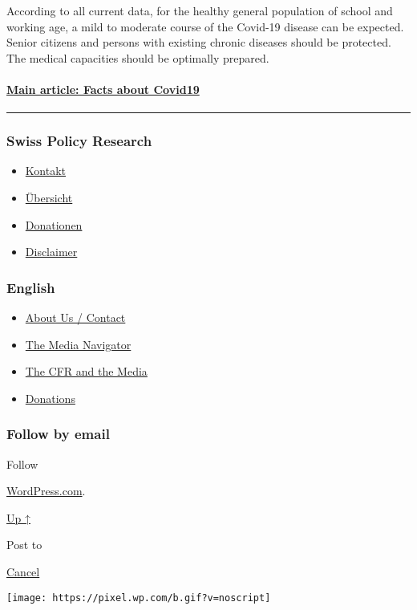 According to all current data, for the healthy general population of
school and working age, a mild to moderate course of the Covid-19
disease can be expected. Senior citizens and persons with existing
chronic diseases should be protected. The medical capacities should be
optimally prepared.

\hypertarget{main-article-facts-about-covid19}{%
\paragraph{\texorpdfstring{\href{https://swprs.org/a-swiss-doctor-on-covid-19/}{Main
article: Facts about
Covid19}}{Main article: Facts about Covid19}}\label{main-article-facts-about-covid19}}

\begin{center}\rule{0.5\linewidth}{\linethickness}\end{center}

\hypertarget{swiss-policy-research}{%
\subsubsection{Swiss Policy Research}\label{swiss-policy-research}}

\begin{itemize}
\tightlist
\item
  \href{https://swprs.org/kontakt/}{Kontakt}
\item
  \href{https://swprs.org/uebersicht/}{Übersicht}
\item
  \href{https://swprs.org/donationen/}{Donationen}
\item
  \href{https://swprs.org/disclaimer/}{Disclaimer}
\end{itemize}

\hypertarget{english}{%
\subsubsection{English}\label{english}}

\begin{itemize}
\tightlist
\item
  \href{https://swprs.org/contact/}{About Us / Contact}
\item
  \href{https://swprs.org/media-navigator/}{The Media Navigator}
\item
  \href{https://swprs.org/the-american-empire-and-its-media/}{The CFR
  and the Media}
\item
  \href{https://swprs.org/donations/}{Donations}
\end{itemize}

\hypertarget{follow-by-email}{%
\subsubsection{Follow by email}\label{follow-by-email}}

Follow

\href{https://wordpress.com/?ref=footer_custom_com}{WordPress.com}.

\protect\hyperlink{}{Up ↑}

Post to

\protect\hyperlink{}{Cancel}

\texttt{[image: https://pixel.wp.com/b.gif?v=noscript]}
